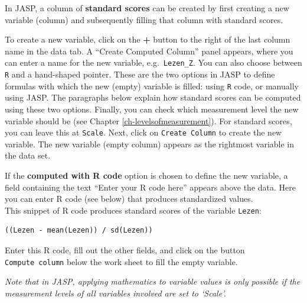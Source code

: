 \documentclass[
]{book}
\begin{document}
In JASP, a column of \textbf{standard scores} can be created by first creating a new variable (column) and subsequently filling that column with standard scores.

To create a new variable, click on the \textbf{+} button to the right of the last column name in the data tab. A ``Create Computed Column'' panel appears, where you can enter a name for the new variable, e.g.~\texttt{Lezen\_Z}. You can also choose between \texttt{R} and a hand-shaped pointer. These are the two options in JASP to define formulas with which the new (empty) variable is filled: using \texttt{R} code, or manually using JASP. The paragraphs below explain how standard scores can be computed using these two options. Finally, you can check which measurement level the new variable should be (see Chapter \ref{ch-levelsofmeasurement}). For standard scores, you can leave this at \texttt{Scale}. Next, click on \texttt{Create\ Column} to create the new variable. The new variable (empty column) appears as the rightmost variable in the data set.

If the \textbf{computed with R code} option is chosen to define the new variable, a field containing the text ``Enter your R code here'' appears above the data. Here you can enter R code (see below) that produces standardized values.\\
This snippet of R code produces standard scores of the variable \texttt{Lezen}:

\begin{verbatim}
((Lezen - mean(Lezen)) / sd(Lezen))
\end{verbatim}

Enter this R code, fill out the other fields,
and click on the button \texttt{Compute\ column} below the work sheet to fill the empty variable.

\emph{Note that in JASP, applying mathematics to variable values is only possible if the measurement levels of all variables involved are set to `Scale'.}
\end{document}
